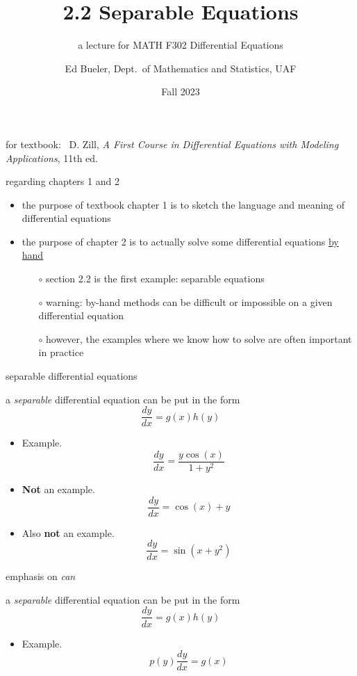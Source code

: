 \documentclass{beamer}
\title{2.2 Separable Equations}
\subtitle{a lecture for MATH F302 Differential Equations}
\author{Ed Bueler, Dept.~of Mathematics and Statistics, UAF}
\date{Fall 2023}
\begin{document}


\begin{frame}
\titlepage

\centerline{\tiny for textbook: \, D. Zill, \emph{A First Course in Differential Equations with Modeling Applications}, 11th ed.}
\end{frame}


\begin{frame}{regarding chapters 1 and 2}
\begin{itemize}
\item the purpose of textbook chapter 1 is to sketch the language and meaning of differential equations
\item the purpose of chapter 2 is to actually solve some differential equations \underline{by hand}
    \begin{itemize}
    \item[$\circ$] section 2.2 is the first example: separable equations
    \item[$\circ$] \alert{warning:} by-hand methods can be difficult or impossible on a given differential equation
    \item[$\circ$] however, the examples where we know how to solve are often important in practice
    \end{itemize}
\end{itemize}
\end{frame}


\begin{frame}{separable differential equations}

\begin{definition}
a \emph{separable} differential equation can be put in the form
        $$\boxed{\frac{dy}{dx} = g(x) h(y)}$$
\end{definition}

\begin{itemize}
\item Example.
        $$\frac{dy}{dx} = \frac{y\cos(x)}{1+y^2}$$
\item \textbf{Not} an example.
        $$\frac{dy}{dx} = \cos(x) + y$$
\item Also \textbf{not} an example.
        $$\frac{dy}{dx} = \sin(x + y^2)$$
\end{itemize}
\end{frame}


\begin{frame}{emphasis on \emph{can}}

\begin{definition}
a \emph{separable} differential equation \alert{can} be put in the form
        $$\boxed{\frac{dy}{dx} = g(x) h(y)}$$
\end{definition}

\begin{itemize}
\item Example.
        $$p(y) \frac{dy}{dx} = g(x)$$
\end{itemize}
\end{frame}
\end{document}
